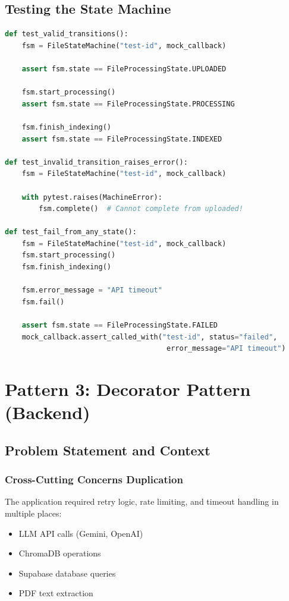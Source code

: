 \documentclass[11pt,a4paper]{article}
\begin{document}
\subsection{Testing the State Machine}

\begin{lstlisting}[language=Python, caption={State Machine Unit Tests}]
def test_valid_transitions():
    fsm = FileStateMachine("test-id", mock_callback)

    assert fsm.state == FileProcessingState.UPLOADED

    fsm.start_processing()
    assert fsm.state == FileProcessingState.PROCESSING

    fsm.finish_indexing()
    assert fsm.state == FileProcessingState.INDEXED

def test_invalid_transition_raises_error():
    fsm = FileStateMachine("test-id", mock_callback)

    with pytest.raises(MachineError):
        fsm.complete()  # Cannot complete from uploaded!

def test_fail_from_any_state():
    fsm = FileStateMachine("test-id", mock_callback)
    fsm.start_processing()
    fsm.finish_indexing()

    fsm.error_message = "API timeout"
    fsm.fail()

    assert fsm.state == FileProcessingState.FAILED
    mock_callback.assert_called_with("test-id", status="failed",
                                      error_message="API timeout")
\end{lstlisting}

\newpage

\section{Pattern 3: Decorator Pattern (Backend)}

\subsection{Problem Statement and Context}

\subsubsection{Cross-Cutting Concerns Duplication}

The application required retry logic, rate limiting, and timeout handling in multiple places:

\begin{itemize}
    \item LLM API calls (Gemini, OpenAI)
    \item ChromaDB operations
    \item Supabase database queries
    \item PDF text extraction
\end{itemize}
\end{document}
